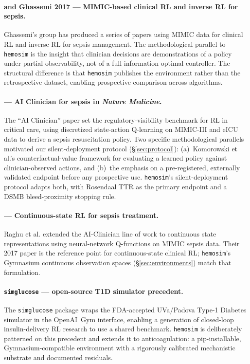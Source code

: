 \documentclass[11pt]{article}
\begin{document}
\paragraph{\citet{ghassemi2018} and Ghassemi 2017 --- MIMIC-based clinical RL and inverse RL for sepsis.}
Ghassemi's group has produced a series of papers using MIMIC data for clinical RL and inverse-RL for sepsis management. The methodological parallel to \texttt{hemosim} is the insight that clinician decisions are demonstrations of a policy under partial observability, not of a full-information optimal controller. The structural difference is that \texttt{hemosim} publishes the environment rather than the retrospective dataset, enabling prospective comparison across algorithms.

\paragraph{\citet{komorowski2018} --- AI Clinician for sepsis in \emph{Nature Medicine}.}
The ``AI Clinician'' paper set the regulatory-visibility benchmark for RL in critical care, using discretized state-action Q-learning on MIMIC-III and eICU data to derive a sepsis resuscitation policy. Two specific methodological parallels motivated our silent-deployment protocol (\S\ref{sec:protocol}): (a)~Komorowski et al.'s counterfactual-value framework for evaluating a learned policy against clinician-observed actions, and (b)~the emphasis on a pre-registered, externally validated endpoint before any prospective use. \texttt{hemosim}'s silent-deployment protocol adapts both, with Rosendaal TTR as the primary endpoint and a DSMB bleed-proximity stopping rule.

\paragraph{\citet{raghu2017} --- Continuous-state RL for sepsis treatment.}
Raghu et al. extended the AI-Clinician line of work to continuous state representations using neural-network Q-functions on MIMIC sepsis data. Their 2017 paper is the reference point for continuous-state clinical RL; \texttt{hemosim}'s Gymnasium continuous observation spaces (\S\ref{sec:environments}) match that formulation.

\paragraph{\texttt{simglucose} --- open-source T1D simulator precedent.}
The \texttt{simglucose} package \citep{simglucose} wraps the FDA-accepted UVa/Padova Type-1 Diabetes simulator in the OpenAI~Gym interface, enabling a generation of closed-loop insulin-delivery RL research to use a shared benchmark. \texttt{hemosim} is deliberately patterned on this precedent and extends it to anticoagulation: a pip-installable, Gymnasium-compatible environment with a rigorously calibrated mechanistic substrate and documented residuals.
\end{document}
